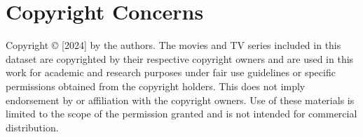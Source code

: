 \section*{Copyright Concerns}

Copyright © [2024] by the authors. The movies and TV series included in this dataset are copyrighted by their respective copyright owners and are used in this work for academic and research purposes under fair use guidelines or specific permissions obtained from the copyright holders. This does not imply endorsement by or affiliation with the copyright owners. Use of these materials is limited to the scope of the permission granted and is not intended for commercial distribution.

